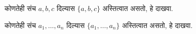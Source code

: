 \documentclass[../../../include/open-logic-section]{subfiles}
\begin{document}
\begin{prob}
कोणतेही संच $a, b, c$ दिल्यास $\{a, b, c\}$ अस्तित्वात असतो, हे दाखवा.
\end{prob}

\begin{prob}
कोणतेही संच $a_1, \ldots, a_n$ दिल्यास $\{a_1, \ldots,
a_n\}$ अस्तित्वात असतो, हे दाखवा.
\end{prob}

\end{document}
